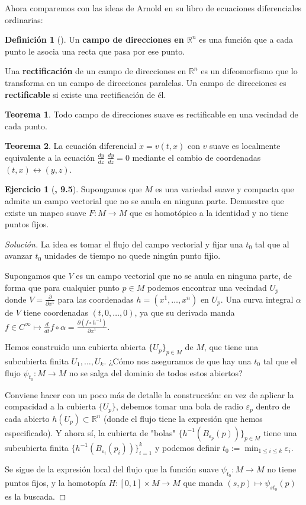 \documentclass[spanish]{book}
\theoremstyle{definition}
\newtheorem*{defn}{Definición}
\newtheorem*{teo}{Teorema}
\newtheorem*{ejer*}{Ejercicio}
\newcommand{\R}{\mathbb{R}}
\newcommand{\Cinf}{C^\infty}
\begin{document}
Ahora comparemos con las ideas de Arnold en su libro de ecuaciones diferenciales ordinarias:
\begin{defn}[\cite{Arnold}]
	Un \textbf{campo de direcciones en $\R^n$} es una función que a cada punto le asocia una recta que pasa por ese punto.
	
	Una \textbf{rectificación} de un campo de direcciones en $\R^n$ es un difeomorfismo que lo transforma en un campo de direcciones paralelas. Un campo de direcciones es \textbf{rectificable} si existe una rectificación de él.
\end{defn}
\begin{teo}
	Todo campo de direcciones suave es rectificable en una vecindad de cada punto.
\end{teo}
\begin{teo}
	La ecuación diferencial $\dot{x}=v(t,x)$ con $v$ suave es localmente equivalente a la ecuación $\frac{dy}{dz}$ $\frac{dy}{dz}=0$ mediante el cambio de coordenadas $(t,x)\leftrightarrow(y,z)$.
\end{teo}
\begin{ejer*}[\cite{Lee}\textbf{, 9.5}]
	Supongamos que $M$ es una variedad suave y compacta que admite un campo vectorial que no se anula en ninguna parte. Demuestre que existe un mapeo suave $F:M\to M$ que es homotópico a la identidad y no tiene puntos fijos.
\end{ejer*}
\begin{proof}[Solución]
	La idea es tomar el flujo del campo vectorial y fijar una $t_0$ tal que al avanzar $t_0$ unidades de tiempo no quede ningún punto fijio.
	
	Supongamos que $V$ es un campo vectorial que no se anula en ninguna parte, de forma que para cualquier punto $p\in M$ podemos encontrar una vecindad $U_p$ donde $V=\frac{\partial}{\partial x^1}$ para las coordenadas $h=(x^1,\ldots,x^n)$ en $U_p$. Una curva integral $\alpha$ de $V$ tiene coordenadas $(t,0,\ldots,0)$, ya que su derivada manda $f\in\Cinf\mapsto\frac{d}{dt}f\circ\alpha=\frac{\partial (f\circ h^{-1})}{\partial x^1}$.
	
	Hemos construido una cubierta abierta $\{U_p\}_{p\in M}$ de $M$, que tiene una subcubierta finita $U_1,\ldots, U_k$. ¿Cómo nos aseguramos de que hay una $t_0$ tal que el flujo $\psi_{t_0}:M\to M$ no se salga del dominio de todos estos abiertos?
	
	Conviene hacer con un poco más de detalle la construcción: en vez de aplicar la compacidad a la cubierta $\{U_p\}$, debemos tomar una bola de radio $\varepsilon_p$ dentro de cada abierto $h(U_p)\subset\R^n$ (donde el flujo tiene la expresión que hemos especificado). Y ahora sí, la cubierta de "bolas" $\{h^{-1}(B_{\varepsilon_p}(p))\}_{p\in M}$ tiene una subcubierta finita $\{h^{-1}(B_{\varepsilon_i}(p_i))\}_{i=1}^k$ y podemos definir $t_0:=\min_{1\leq i\leq k}\varepsilon_i$.
	
	Se sigue de la expresión local del flujo que la función suave $\psi_{t_0}:M\to M$ no tiene puntos fijos, y la homotopía $H:[0,1]\times M\to M$ que manda $(s,p)\mapsto \psi_{st_0}(p)$ es la buscada.
\end{proof}
\end{document}
